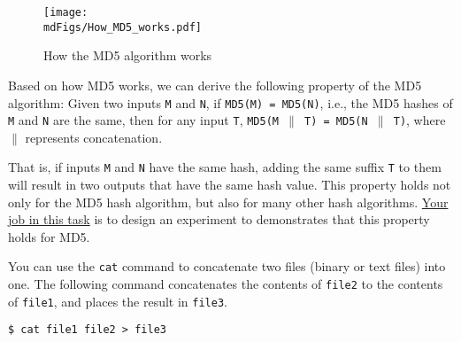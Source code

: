 \begin{figure}[htb]
	\centering
	\texttt{[image: \\mdFigs/How\_MD5\_works.pdf]}
	\caption{How the MD5 algorithm works}
	\label{md5:fig:how_md5_works}
\end{figure}


Based on how MD5 works, we can derive the following property of the MD5 algorithm: 
Given two inputs \texttt{M} and \texttt{N}, if \texttt{MD5(M) = MD5(N)}, i.e.,
the MD5 hashes of \texttt{M} and \texttt{N} are the same,
then for any input \texttt{T}, \texttt{MD5(M $\|$ T) = MD5(N $\|$ T)}, 
where \texttt{$\|$} represents concatenation.  

That is, if inputs \texttt{M} and \texttt{N} have the same hash, adding
the same suffix \texttt{T} to them will result in two
outputs that have the same hash value. 
This property holds not only for the MD5 hash algorithm, but also for many other hash
algorithms. \underline{Your job in this task} is to design an experiment to demonstrates
that this property holds for MD5.  


You can use the \texttt{cat} command to concatenate two files (binary or text files)
into one. The following command concatenates the contents of
\texttt{file2} to the contents of \texttt{file1}, and places the result in
\texttt{file3}.  


\begin{lstlisting}
$ cat file1 file2 > file3
\end{lstlisting}
 





